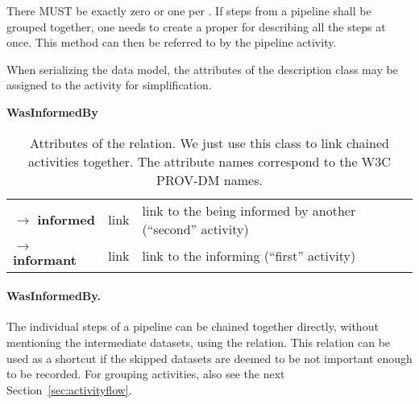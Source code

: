 There MUST be exactly zero or one  per . If steps from a 
pipeline shall be grouped together, one needs to create a proper 
 for describing all the steps at once. This method can then 
be referred to by the pipeline activity. 

When serializing the data model, the attributes
of the description class may be assigned to the activity for simplification.

\begin{table}[h]
\small
{}\textwidth
\textbf{\normalsize WasInformedBy}\vspace{0.25em}\\
\begin{tabulary}{1.0\textwidth}{@{}lp{3cm}L@{}}
\toprule
{} &    & \\
\midrule
$\rightarrow$ \textbf{informed} & link      & link to the  being informed by another (``second'' activity)\\
$\rightarrow$ \textbf{informant}      & link      & link to the informing  (``first'' activity)\\
\bottomrule
\end{tabulary}
\caption[Attributes of the  relation]{Attributes of the
 relation. We just use this class to link chained activities together. The attribute names correspond to the W3C PROV-DM names.
}\label{tab:wasinformedby-attributes}
\end{table}

\paragraph{WasInformedBy.}
The individual steps of a pipeline can be chained together directly, without
mentioning the intermediate datasets, using the  relation.
This relation can be used as a shortcut if the skipped datasets are deemed
to be not important enough to be recorded. For grouping activities, also see
the next Section~\ref{sec:activityflow}.


